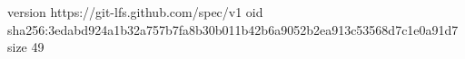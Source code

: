 version https://git-lfs.github.com/spec/v1
oid sha256:3edabd924a1b32a757b7fa8b30b011b42b6a9052b2ea913c53568d7c1e0a91d7
size 49

